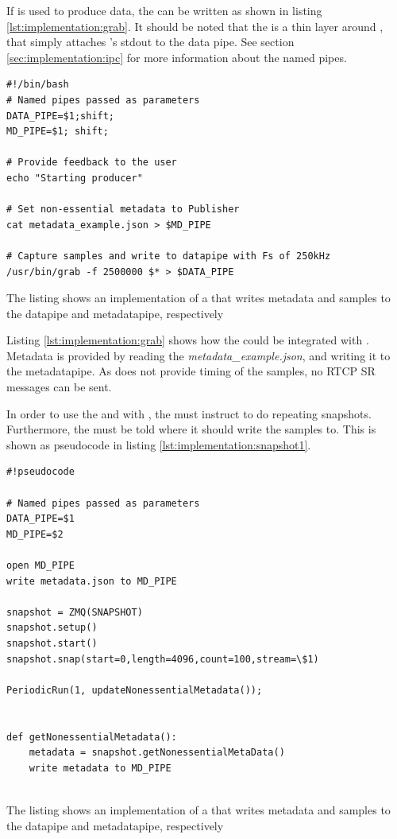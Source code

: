 If  is used to produce data, the \con{} can be written as shown in listing \ref{lst:implementation:grab}. It should be noted that the \pro{} is a thin layer around , that simply attaches 's stdout to the data pipe. See section \ref{sec:implementation:ipc} for more information about the named pipes.

\begin{listing}[H] 
\begin{verbatim}
#!/bin/bash
# Named pipes passed as parameters
DATA_PIPE=$1;shift;
MD_PIPE=$1; shift;

# Provide feedback to the user
echo "Starting producer"

# Set non-essential metadata to Publisher
cat metadata_example.json > $MD_PIPE

# Capture samples and write to datapipe with Fs of 250kHz
/usr/bin/grab -f 2500000 $* > $DATA_PIPE
\end{verbatim}
\caption{The listing shows an implementation of a \pro{} that writes metadata and samples to the datapipe and metadatapipe, respectively}
\label{lst:implementation:grab}
\end{listing}

\noindent{}Listing \ref{lst:implementation:grab} shows how the \pro{} could be integrated with .
Metadata is provided by reading the \textit{metadata\_example.json}, and writing it to the metadatapipe.
As  does not provide timing of the samples, no RTCP SR messages can be sent.


In order to use the \pub{} and \pub{} with , the \pro{} must instruct  to do repeating snapshots. Furthermore, the  must be told where it should write the samples to. This is shown as pseudocode in listing \ref{lst:implementation:snapshot1}.

\begin{listing}[H] 
\begin{verbatim}
#!pseudocode

# Named pipes passed as parameters
DATA_PIPE=$1
MD_PIPE=$2

open MD_PIPE
write metadata.json to MD_PIPE

snapshot = ZMQ(SNAPSHOT)
snapshot.setup()
snapshot.start()
snapshot.snap(start=0,length=4096,count=100,stream=\$1)

PeriodicRun(1, updateNonessentialMetadata());


def getNonessentialMetadata():
	metadata = snapshot.getNonessentialMetaData()
	write metadata to MD_PIPE
	
\end{verbatim}
\caption{The listing shows an implementation of a \pro{} that writes metadata and samples to the datapipe and metadatapipe, respectively}
\label{lst:implementation:snapshot1}
\end{listing}

